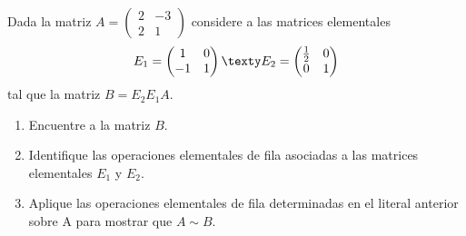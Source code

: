 \documentclass[compacto,10pt]{pubciencias-notas}
\begin{document}
\begin{ejer}\hspace{0pt} Dada la matriz $A = \begin{pmatrix}2&-3\\2&1\end{pmatrix}$ considere a las matrices elementales
\[
    E_{1} = \begin{pmatrix}1&0\\-1&1\end{pmatrix}
    \texty
    E_{2} = \begin{pmatrix}\frac{1}{2}&0\\0&1\end{pmatrix}
\]
tal que la matriz $B = E_{2}E_{1}A$.
\begin{enumerate}
\item[$a)$] Encuentre a la matriz $B$.
\item[$b)$] Identifique las operaciones elementales de fila asociadas a las matrices elementales $E_{1}$ y $E_{2}$.
\item[$c)$] Aplique las operaciones elementales de fila determinadas en el literal anterior sobre A para mostrar que $A\sim B$.
\end{enumerate}
\end{ejer}
\end{document}
